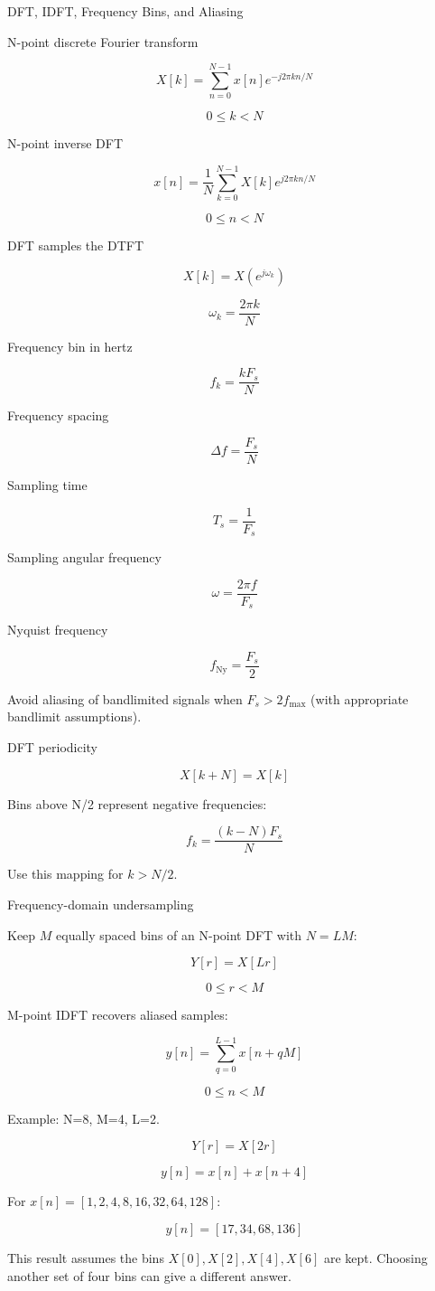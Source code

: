 DFT, IDFT, Frequency Bins, and Aliasing

N-point discrete Fourier transform

$$X[k]=\sum_{n=0}^{N-1}x[n]e^{-j2\pi kn/N}$$

$$0\le k<N$$

N-point inverse DFT

$$x[n]=\frac{1}{N}\sum_{k=0}^{N-1}X[k]e^{j2\pi kn/N}$$

$$0\le n<N$$

DFT samples the DTFT

$$X[k]=X(e^{j\omega_k})$$

$$\omega_k=\frac{2\pi k}{N}$$

Frequency bin in hertz

$$f_k=\frac{kF_s}{N}$$

Frequency spacing

$$\Delta f=\frac{F_s}{N}$$

Sampling time

$$T_s=\frac{1}{F_s}$$

Sampling angular frequency

$$\omega=\frac{2\pi f}{F_s}$$

Nyquist frequency

$$f_{\text{Ny}}=\frac{F_s}{2}$$

Avoid aliasing of bandlimited signals when $F_s>2f_{\max}$ (with appropriate bandlimit assumptions).

DFT periodicity

$$X[k+N]=X[k]$$

Bins above N/2 represent negative frequencies:

$$f_k=\frac{(k-N)F_s}{N}$$

Use this mapping for $k>N/2$.

Frequency-domain undersampling

Keep $M$ equally spaced bins of an N-point DFT with $N=LM$:

$$Y[r]=X[Lr]$$

$$0\le r<M$$

M-point IDFT recovers aliased samples:

$$y[n]=\sum_{q=0}^{L-1}x[n+qM]$$

$$0\le n<M$$

Example: N=8, M=4, L=2.

$$Y[r]=X[2r]$$

$$y[n]=x[n]+x[n+4]$$

For $x[n]=[1,2,4,8,16,32,64,128]$:

$$y[n]=[17,34,68,136]$$

This result assumes the bins $X[0],X[2],X[4],X[6]$ are kept. Choosing another set of four bins can give a different answer.
